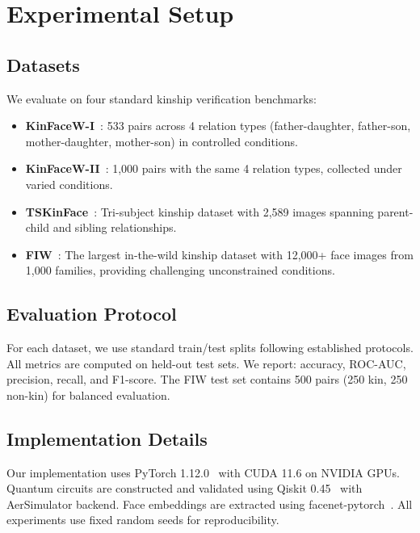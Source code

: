 \documentclass[journal,12pt]{IEEEtran}
\begin{document}
\section{Experimental Setup}
\label{sec:exp_setup}

\subsection{Datasets}
\label{sec:datasets}

We evaluate on four standard kinship verification benchmarks:

\begin{itemize}
    \item \textbf{KinFaceW-I}~\cite{lu2014kinship}: 533 pairs across
          4 relation types (father-daughter, father-son, mother-daughter,
          mother-son) in controlled conditions.
    \item \textbf{KinFaceW-II}~\cite{lu2014kinship}: 1,000 pairs with
          the same 4 relation types, collected under varied conditions.
    \item \textbf{TSKinFace}~\cite{qin2015tskinface}: Tri-subject kinship
          dataset with 2,589 images spanning parent-child and
          sibling relationships.
    \item \textbf{FIW}~\cite{robinson2018visual}: The largest in-the-wild
          kinship dataset with 12,000+ face images from 1,000 families,
          providing challenging unconstrained conditions.
\end{itemize}

\subsection{Evaluation Protocol}

For each dataset, we use standard train/test splits following established
protocols. All metrics are computed on held-out test sets. We report:
accuracy, ROC-AUC, precision, recall, and F1-score. The FIW test set
contains 500 pairs (250 kin, 250 non-kin) for balanced evaluation.

\subsection{Implementation Details}

Our implementation uses PyTorch 1.12.0~\cite{paszke2019pytorch} with
CUDA 11.6 on NVIDIA GPUs. Quantum circuits are constructed and validated
using Qiskit 0.45~\cite{qiskit2024} with AerSimulator backend. Face
embeddings are extracted using facenet-pytorch~\cite{rusinov2020facenet}.
All experiments use fixed random seeds for reproducibility.
\end{document}
